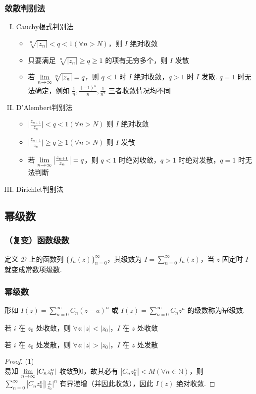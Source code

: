 \documentclass[./main.tex]{subfiles}
\begin{document}
\subsubsection{敛散判别法}
\begin{enumerate}[(I)]
    \item Cauchy根式判别法
    \begin{itemize}
        \item $\sqrt[n]{|z_n|}<q<1(\forall n>N)$，则 $I$ 绝对收敛
        \item 只要满足 $\sqrt[n]{|z_n|}\ge q\ge 1$ 的项有无穷多个，则 $I$ 发散
        \item 若 $\lim\limits_{n\rightarrow\infty}\sqrt[n]{|z_n|}=q$，则 $q<1$ 时 $I$ 绝对收敛，$q>1$ 时 $I$ 发散. $q=1$ 时无法确定，例如 $\frac{1}{n},\frac{(-1)^n}{n},\frac{1}{n^2}$ 三者收敛情况均不同
    \end{itemize}
    \item D'Alembert判别法
    \begin{itemize}
        \item $\big|\frac{z_{n+1}}{z_n}\big|<q<1(\forall n>N)$ 则 $I$ 绝对收敛
        \item $\big|\frac{z_{n+1}}{z_n}\big|\ge q\ge 1(\forall n>N)$ 则 $I$ 发散
        \item 若 $\lim\limits_{n\rightarrow\infty}\big|\frac{z_{n+1}}{z_n}\big|=q$，则 $q<1$ 时绝对收敛，$q>1$ 时绝对发散，$q=1$ 时无法判断
        \end{itemize}
    \item Dirichlet判别法
\end{enumerate}

\subsection{幂级数}
\subsubsection{（复变）函数级数}
定义 $\mathscr{D}$ 上的函数列 $\{f_n(z)\}_{n=0}^{\infty}$，其级数为 $I=\sum_{n=0}^{\infty}f_n(z)$，当 $z$ 固定时 $I$ 就变成常数项级数. 
\subsubsection{幂级数}
形如 $I(z)=\sum_{n=0}^{\infty}C_n(z-a)^n$ 或 $I(z)=\sum_{n=0}^{\infty}C_nz^n$ 的级数称为幂级数. 
\begin{enumerate*}
\item 若 $i$ 在 $z_0$ 处收敛，则 $\forall z:|z|<|z_0|$，$I$ 在 $z$ 处收敛
\item 若 $i$ 在 $z_0$ 处发散，则 $\forall z:|z|>|z_0|$，$I$ 在 $z$ 处发散
\end{enumerate*}
\begin{proof}(1)\\易知 $\lim\limits_{n\rightarrow\infty}|C_nz_0^n|$ 收敛到0，故其必有 $|C_nz_0^n|<M(\forall n\in\mathbb{N})$，则 $\sum_{n=0}^{\infty}|C_nz_0^n|\big|\frac{z}{z_0}\big|^n$ 有界递增（并因此收敛），因此 $I(z)$ 绝对收敛. 
\end{proof}
\end{document}
